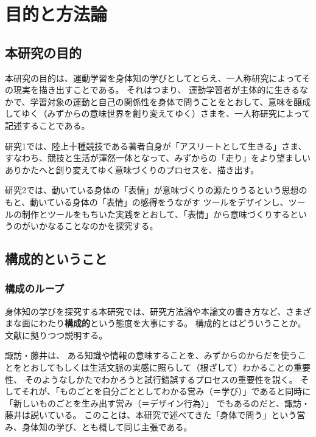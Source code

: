 \chapter{目的と方法論}
\label{chapter:mokutekiandhouhou}
\section{本研究の目的}
本研究の目的は、運動学習を身体知の学びとしてとらえ、一人称研究によってその現実を描き出すことである。
それはつまり、
運動学習者が主体的に生きるなかで、学習対象の運動と自己の関係性を身体で問うことをとおして、意味を醸成してゆく（みずからの意味世界を創り変えてゆく）さまを、一人称研究によって記述することである。

研究1では、陸上十種競技である著者自身が「アスリートとして生きる」さま、すなわち、競技と生活が渾然一体となって、みずからの「走り」をより望ましいありかたへと創り変えてゆく意味づくりのプロセスを、描き出す。

研究2では、動いている身体の「表情」が意味づくりの源たりうるという思想のもと、動いている身体の「表情」の感得をうながす
ツールをデザインし、ツールの制作とツールをもちいた実践をとおして、「表情」から意味づくりするというのがいかなることなのかを探究する。
\section{構成的ということ}
\subsection{構成のループ}
\label{subsec:constructionloop}
身体知の学びを探究する本研究では、研究方法論や本論文の書き方など、さまざまな面にわたり\textbf{構成的}\cite{nakashima_et_al:2008,suwa_fujii:2015,suwa_hori:2015,suwa:2022}という態度を大事にする。
構成的とはどういうことか。
文献\cite{nakashima_et_al:2008,suwa_fujii:2015,suwa_hori:2015,suwa:2022}に拠りつつ説明する。

諏訪・藤井は、
ある知識や情報の意味することを、みずからのからだを使うことをとおしてもしくは生活文脈の実感に照らして（根ざして）わかることの重要性、
そのようなしかたでわかろうと試行錯誤するプロセスの重要性を説く。
そしてそれが、「ものごとを自分ごととしてわかる営み（＝学び）」であると同時に「新しいものごとを生み出す営み（＝デザイン行為）」
でもあるのだと、諏訪・藤井\cite{suwa_fujii:2015}は説いている。
このことは、本研究で述べてきた「身体で問う」という営み、身体知の学び、とも概して同じ主張である。

